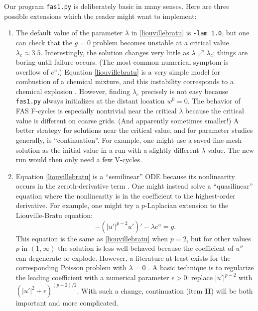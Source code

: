 \documentclass[letterpaper,final,12pt,reqno]{amsart}
\newcommand{\eps}{\epsilon}
\begin{document}
Our program \texttt{fas1.py} is deliberately basic in many senses.  Here are three possible extensions which the reader might want to implement:
\renewcommand{\labelenumi}{\textbf{\Roman{enumi}.}}
\begin{enumerate}
\item The default value of the parameter $\lambda$ in \eqref{liouvillebratu} is \texttt{-lam 1.0}, but one can check that the $g=0$ problem becomes unstable at a critical value $\lambda_c \approx 3.5$.  Interestingly, the solution changes very little as $\lambda \nearrow \lambda_c$; things are boring until failure occurs.  (The most-common numerical symptom is overflow of $e^u$.)  Equation \eqref{liouvillebratu} is a very simple model for combustion of a chemical mixture, and this instability corresponds to a chemical explosion \cite{FrankKameneckij1955}.  However, finding $\lambda_c$ precisely is not easy because \texttt{fas1.py} always initializes at the distant location $w^0=0$.  The behavior of FAS F-cycles is especially nontrivial near the critical $\lambda$ because the critical value is different on coarse grids.  (And apparently sometimes smaller!)  A better strategy for solutions near the critical value, and for parameter studies generally, is ``continuation''.  For example, one might use a saved fine-mesh solution as the initial value in a run with a slightly-different $\lambda$ value.  The new run would then only need a few V-cycles.
\item Equation \eqref{liouvillebratu} is a ``semilinear'' ODE because its nonlinearity occurs in the zeroth-derivative term \cite{Evans2010}.  One might instead solve a ``quasilinear'' equation where the nonlinearity is in the coefficient to the highest-order derivative.  For example, one might try a $p$-Laplacian \cite{Evans2010} extension to the Liouville-Bratu equation:
\begin{equation}
  -\left(|u'|^{p-2} u'\right)' - \lambda e^u = g.  \label{pbratu}
\end{equation}
This equation is the same as \eqref{liouvillebratu} when $p=2$, but for other values $p$ in $(1,\infty)$ the solution is less well-behaved because the coefficient of $u''$ can degenerate or explode.  However, a literature at least exists for the corresponding Poisson problem with $\lambda=0$ \cite{BarrettLiu1993,Bueler2021}.  A basic technique is to regularize the leading coefficient with a numerical parameter $\eps>0$: replace $|u'|^{p-2}$ with $\left(|u'|^2+\eps\right)^{(p-2)/2}$.  With such a change, continuation (item \textbf{II}) will be both important and more complicated.

\end{enumerate}
\end{document}
